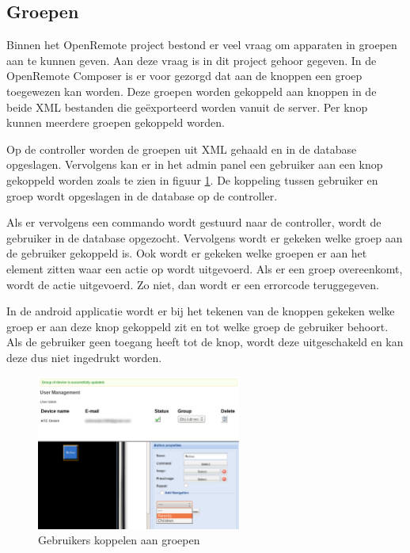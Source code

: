 \documentclass[]{article}
\begin{document}
\newpage
\subsection{Groepen}
Binnen het OpenRemote project bestond er veel vraag om apparaten in groepen aan
te kunnen geven. Aan deze vraag is in dit project gehoor gegeven. In de
OpenRemote Composer is er voor gezorgd dat aan de knoppen een groep toegewezen
kan worden. Deze groepen worden gekoppeld aan knoppen in de beide XML bestanden
die ge\"exporteerd worden vanuit de server. Per knop kunnen meerdere groepen
gekoppeld worden.

Op de controller worden de groepen uit XML gehaald en in de database opgeslagen.
Vervolgens kan er in het admin panel een gebruiker aan een knop gekoppeld
worden zoals te zien in figuur \ref{usergroups}. De koppeling tussen gebruiker
en groep wordt opgeslagen in de database op de controller. 

Als er vervolgens een commando wordt gestuurd naar de controller, wordt de
gebruiker in de database opgezocht. Vervolgens wordt er gekeken welke groep aan
de gebruiker gekoppeld is. Ook wordt er gekeken welke groepen er aan het element
zitten waar een actie op wordt uitgevoerd. Als er een groep overeenkomt, wordt
de actie uitgevoerd. Zo niet, dan wordt er een errorcode teruggegeven.

In de android applicatie wordt er bij het tekenen van de knoppen gekeken welke
groep er aan deze knop gekoppeld zit en tot welke groep de gebruiker behoort.
Als de gebruiker geen toegang heeft tot de knop, wordt deze uitgeschakeld en kan deze
dus niet ingedrukt worden.

\begin{figure}[htpb]
   \begin{center}
     \includegraphics[width=0.6\textwidth]{usergroups.pdf}
   \end{center}
   \caption{Gebruikers koppelen aan groepen}
   \label{usergroups}
\end{figure}
\end{document}
